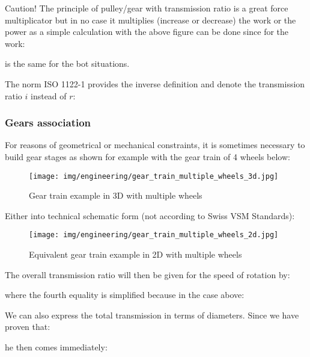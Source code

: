 	Caution! The principle of pulley/gear with transmission ratio is a great force multiplicator but in no case it multiplies (increase or decrease) the work or the power as a simple calculation with the above figure can be done since for the work:
	
	is the same for the bot situations.
	
	\begin{tcolorbox}[title=Remark,colframe=black,arc=10pt]
	The norm ISO 1122-1  provides the inverse definition and denote the transmission ratio $i$ instead of $r$:
	
	\end{tcolorbox}

	\subsubsection{Gears association}
	For reasons of geometrical or mechanical constraints, it is sometimes necessary to build gear stages as shown for example with the gear train of 4 wheels below:
	\begin{figure}[H]
		\begin{center}
			\texttt{[image: img/engineering/gear\_train\_multiple\_wheels\_3d.jpg]}
		\end{center}	
		\caption{Gear train example in 3D with multiple wheels}
	\end{figure}
	Either into technical schematic form (not according to Swiss VSM Standards):
	\begin{figure}[H]
		\begin{center}
			\texttt{[image: img/engineering/gear\_train\_multiple\_wheels\_2d.jpg]}
		\end{center}	
		\caption{Equivalent gear train example in 2D with multiple wheels}
	\end{figure}
	The overall transmission ratio will then be given for the speed of rotation by:
	
	where the fourth equality is simplified because in the case above:
	
	We can also express the total transmission in terms of diameters. Since we have proven that:
	
	he then comes immediately:
	
